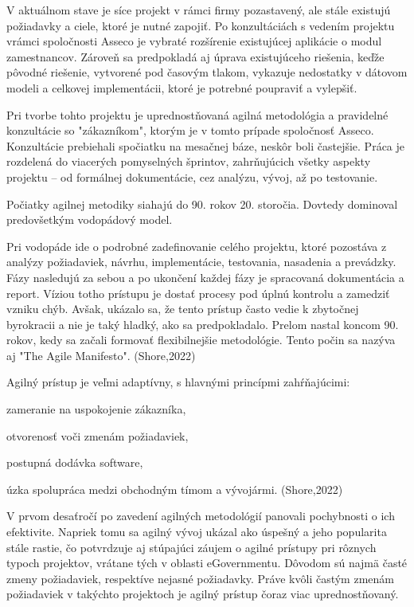 V aktuálnom stave je síce projekt v rámci firmy pozastavený, ale stále existujú požiadavky a ciele, ktoré je nutné zapojiť. Po konzultáciách s vedením projektu vrámci spoločnosti Asseco je vybraté rozšírenie existujúcej aplikácie o modul zamestnancov. Zároveň sa predpokladá aj úprava existujúceho riešenia, keďže pôvodné riešenie, vytvorené pod časovým tlakom, vykazuje nedostatky v dátovom modeli a celkovej implementácii, ktoré je potrebné poupraviť a vylepšiť.

Pri tvorbe tohto projektu je uprednostňovaná agilná metodológia a pravidelné konzultácie so "zákazníkom", ktorým je v tomto prípade spoločnosť Asseco. Konzultácie prebiehali spočiatku na mesačnej báze, neskôr boli častejšie. Práca je rozdelená do viacerých pomyselných šprintov, zahrňujúcich všetky aspekty projektu -- od formálnej dokumentácie, cez analýzu, vývoj, až po testovanie.

Počiatky agilnej metodiky siahajú do 90. rokov 20. storočia. Dovtedy dominoval predovšetkým vodopádový model.

Pri vodopáde ide o podrobné zadefinovanie celého projektu, ktoré pozostáva z analýzy požiadaviek, návrhu, implementácie, testovania, nasadenia a prevádzky. Fázy nasledujú za sebou a po ukončení každej fázy je spracovaná dokumentácia a report. Víziou totho prístupu je dostať procesy pod úplnú kontrolu a zamedziť vzniku chýb. Avšak, ukázalo sa, že tento prístup často vedie k zbytočnej byrokracii a nie je taký hladký, ako sa predpokladalo. Prelom nastal koncom 90. rokov, kedy sa začali formovať flexibilnejšie metodológie. Tento počin sa nazýva aj "The Agile Manifesto". \scr(Shore,2022)

Agilný prístup je veľmi adaptívny, s hlavnými princípmi zahŕňajúcimi:

\startitemize
\item zameranie na uspokojenie zákazníka, 
\item otvorenosť voči zmenám požiadaviek,
\item postupná dodávka software,
\item úzka spolupráca medzi obchodným tímom a vývojármi. \scr(Shore,2022) 
\stopitemize

V prvom desaťročí po zavedení agilných metodológií panovali pochybnosti o ich efektivite. Napriek tomu sa agilný vývoj ukázal ako úspešný a jeho popularita stále rastie, čo potvrdzuje aj stúpajúci záujem o agilné prístupy pri rôznych typoch projektov, vrátane tých v oblasti eGovernmentu. Dôvodom sú najmä časté zmeny požiadaviek, respektíve nejasné požiadavky. Práve kvôli častým zmenám požiadaviek v takýchto projektoch je agilný prístup čoraz viac uprednostňovaný.

